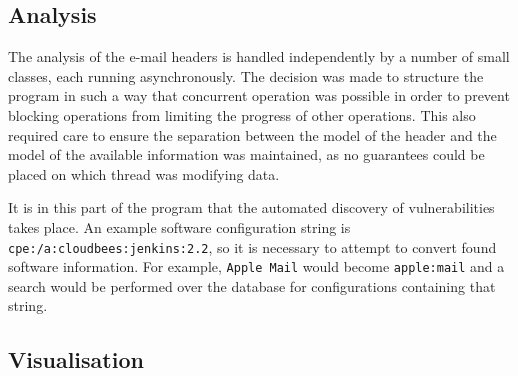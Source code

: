 \subsection{Analysis}

The analysis of the e-mail headers is handled independently by a number of
small classes, each running asynchronously.  The decision was made to structure
the program in such a way that concurrent operation was possible in order to
prevent blocking operations from limiting the progress of other operations.
This also required care to ensure the separation between the model of the
header and the model of the available information was maintained, as no
guarantees could be placed on which thread was modifying data.

It is in this part of the program that the automated discovery of
vulnerabilities takes place.  An example software configuration string is
\texttt{cpe:/a:cloudbees:jenkins:2.2}, so it is necessary to attempt to convert
found software information.  For example, \texttt{Apple Mail} would become
\texttt{apple:mail} and a search would be performed over the database for
configurations containing that string.


\subsection{Visualisation}


